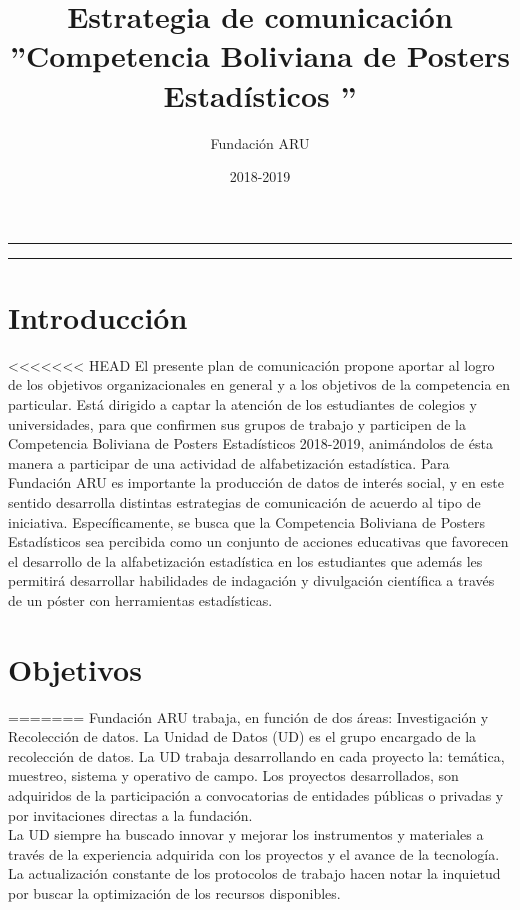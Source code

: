 \documentclass{article}
\title{\textbf{Estrategia de comunicación} \\ ''Competencia Boliviana de Posters Estadísticos ''}
\author{Fundación ARU}
\date{2018-2019 }
\begin{document}
\maketitle

\hrule
\hrule
\newpage

\section{Introducción}

<<<<<<< HEAD
El presente plan de comunicación propone aportar al logro de los objetivos organizacionales en general y a los objetivos de la competencia en particular. Está dirigido a captar la atención de los estudiantes de colegios y universidades, para que confirmen sus grupos de trabajo y participen de la Competencia Boliviana de Posters Estadísticos 2018-2019, animándolos de ésta manera a participar de una actividad de alfabetización estadística.
Para Fundación ARU es importante la producción de datos de interés social, y en este sentido desarrolla distintas estrategias de comunicación de acuerdo al tipo de iniciativa. Específicamente, se busca que la Competencia Boliviana de Posters Estadísticos sea percibida como un conjunto de acciones educativas que favorecen el desarrollo de la alfabetización estadística en los estudiantes que además les permitirá desarrollar habilidades de indagación y divulgación científica a través de un póster con herramientas estadísticas.

\section{Objetivos}
=======
Fundación ARU trabaja, en función de dos áreas: Investigación y Recolección de datos. La Unidad de Datos (UD) es el grupo encargado de la recolección de datos. La UD trabaja desarrollando en cada proyecto la: temática, muestreo, sistema y operativo de campo. Los proyectos desarrollados, son adquiridos de la participación a convocatorias de entidades públicas o privadas y por invitaciones directas a la fundación.\\

La UD siempre ha buscado innovar y mejorar los instrumentos y materiales a través de la experiencia adquirida con los proyectos y el avance de la tecnología. La actualización constante de los protocolos de trabajo hacen notar la inquietud por buscar la optimización de los recursos disponibles.\\                           
\end{document}
